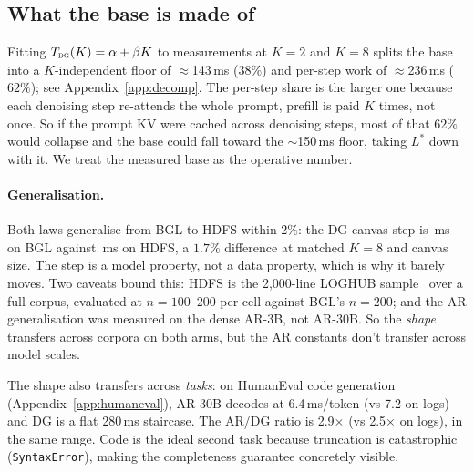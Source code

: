 \subsection{What the base is made of}

Fitting $T_{\textsc{dg}}(K) = \alpha + \beta K$ to measurements at
$K{=}2$ and $K{=}8$ splits the base into a $K$-independent floor of
$\approx$143\,ms ($38\%$) and per-step work of $\approx$236\,ms
($62\%$); see Appendix~\ref{app:decomp}. The per-step share is the
larger one because each denoising step re-attends the whole prompt,
prefill is paid $K$ times, not once. So if the prompt KV were cached
across denoising steps, most of that $62\%$ would collapse and the
base could fall toward the $\sim$150\,ms floor, taking $L^{*}$ down
with it. We treat the measured base as the operative number.

\paragraph{Generalisation.}

Both laws generalise from BGL to HDFS within 2\%: the DG canvas step
is \bglStep\,ms on BGL against \hdfsStep\,ms on HDFS, a $1.7\%$
difference at matched $K{=}8$ and canvas size. The step is a model
property, not a data property, which is why it barely moves. Two
caveats bound this: HDFS is the 2{,}000-line LOGHUB
sample~\cite{loghub} over a full corpus, evaluated at
$n{=}100$--$200$ per cell against BGL's $n{=}200$; and the AR
generalisation was measured on the dense AR-3B, not AR-30B. So the
\emph{shape} transfers across corpora on both arms, but the AR
constants don't transfer across model scales.

The shape also transfers across \emph{tasks}: on HumanEval code
generation (Appendix~\ref{app:humaneval}), AR-30B decodes at
6.4\,ms/token (vs 7.2 on logs) and DG is a flat 280\,ms staircase. The
AR/DG ratio is 2.9$\times$ (vs 2.5$\times$ on logs), in the same range.
Code is the ideal second task because truncation is catastrophic
(\texttt{SyntaxError}), making the completeness guarantee concretely
visible.

